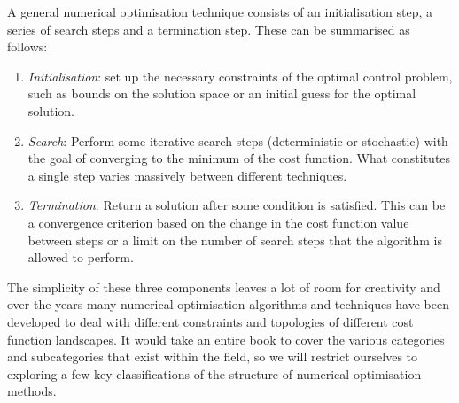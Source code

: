 \documentclass[a4paper,oneside,11pt]{book}
\begin{document}
A general numerical optimisation technique consists of an initialisation step, a series of search steps and a termination step. These can be summarised as follows:
\begin{enumerate}
    \item \emph{Initialisation}: set up the necessary constraints of the optimal control problem, such as bounds on the solution space or an initial guess for the optimal solution.
    \item \emph{Search}: Perform some iterative search steps (deterministic or stochastic) with the goal of converging to the minimum of the cost function. What constitutes a single step varies massively between different techniques.
    \item \emph{Termination}: Return a solution after some condition is satisfied. This can be a convergence criterion based on the change in the cost function value between steps or a limit on the number of search steps that the algorithm is allowed to perform.
\end{enumerate}

The simplicity of these three components leaves a lot of room for creativity and over the years many numerical optimisation algorithms and techniques have been developed to deal with different constraints and topologies of different cost function landscapes. It would take an entire book \cite{nocedal_numerical_2006} to cover the various categories and subcategories that exist within the field, so we will restrict ourselves to exploring a few key classifications of the structure of numerical optimisation methods. 
\end{document}
